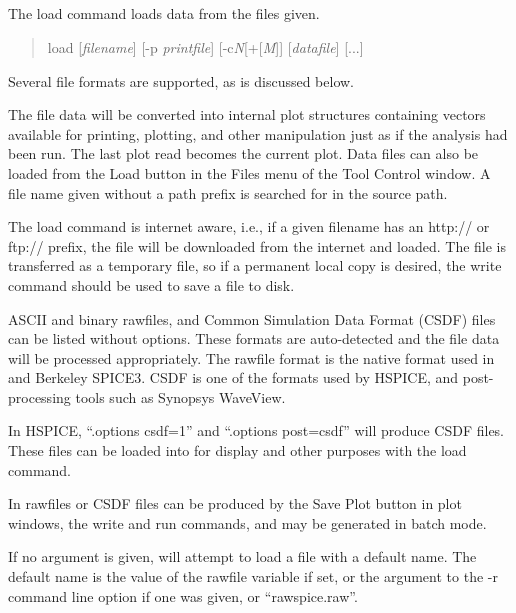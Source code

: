 \subsection{}


The {\cb load} command loads data from the files given.
\begin{quote}\vt
load [{\it filename\/}] [{\vt -p} {\it printfile\/}]
 [{\vt -c}{\it N\/}[{\vt +}[{\it M\/}]] [{\it datafile\/}] [...]
\end{quote}

Several file formats are supported, as is discussed below.

The file data will be converted into internal plot structures
containing vectors available for printing, plotting, and other
manipulation just as if the analysis had been run.  The last plot read
becomes the current plot.  Data files can also be loaded from the {\cb
Load} button in the {\cb Files} menu of the {\cb Tool Control} window. 
A file name given without a path prefix is searched for in the source
path.

The {\cb load} command is internet aware, i.e., if a given filename
has an {\vt http://} or {\vt ftp://} prefix, the file will be
downloaded from the internet and loaded.  The file is transferred as a
temporary file, so if a permanent local copy is desired, the {\cb
write} command should be used to save a file to disk.

ASCII and binary rawfiles, and Common Simulation Data Format (CSDF)
files can be listed without options.  These formats are auto-detected
and the file data will be processed appropriately.  The rawfile format
is the native format used in {\WRspice} and Berkeley SPICE3.  CSDF is
one of the formats used by HSPICE, and post-processing tools such as
Synopsys WaveView.

In HSPICE, ``{\vt .options csdf=1}'' and ``{\vt .options post=csdf}''
will produce CSDF files.  These files can be loaded into {\WRspice}
for display and other purposes with the {\cb load} command.

In {\WRspice} rawfiles or CSDF files can be produced by the {\cb Save
Plot} button in {\cb plot} windows, the {\cb write} and {\cb run}
commands, and may be generated in batch mode.

If no argument is given, {\WRspice} will attempt to load a file with a
default name.  The default name is the value of the {\et rawfile}
variable if set, or the argument to the {\vt -r} command line option
if one was given, or ``{\vt rawspice.raw}''.

